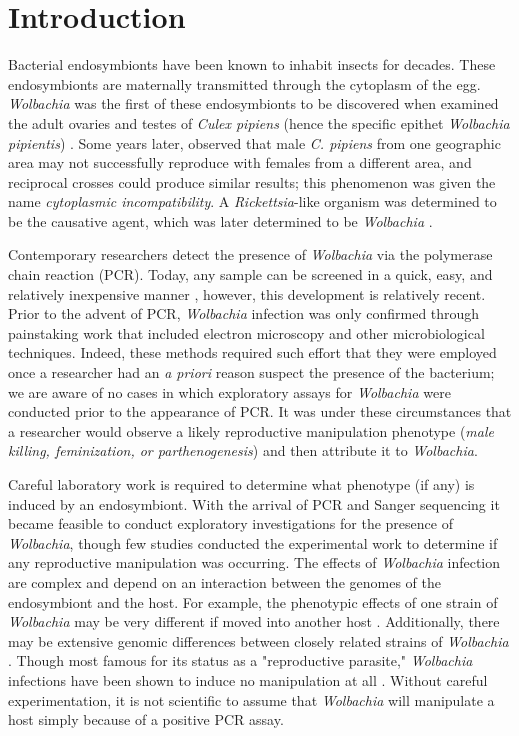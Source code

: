 \documentclass{frontiersSCNS}
\begin{document}
\section{Introduction}

Bacterial endosymbionts have been known to inhabit insects for decades. These endosymbionts are maternally transmitted through the cytoplasm of the egg. \textit{Wolbachia} was the first of these endosymbionts to be discovered when \citet{Hertig:1924wy} examined the adult ovaries and testes of \textit{Culex pipiens} (hence the specific epithet \textit{Wolbachia pipientis}) \citet{Hertig:1936}. Some years later, \citet{Yen:1971tc} observed that male \textit{C. pipiens} from one geographic area may not successfully reproduce with females from a different area, and reciprocal crosses could produce similar results; this phenomenon was given the name \textit{cytoplasmic incompatibility}. A \textit{Rickettsia}-like organism was determined to be the causative agent, which was later determined to be \textit{Wolbachia} \citep{Yen:1973vx}.

Contemporary researchers detect the presence of \textit{Wolbachia} via the polymerase chain reaction (PCR). Today, any sample can be screened in a quick, easy, and relatively inexpensive manner \citep{Baldo:2006p7025,Simoes:2011p11073}, however, this development is relatively recent. Prior to the advent of PCR, \textit{Wolbachia} infection was only confirmed through painstaking work that included electron microscopy and other microbiological techniques. Indeed, these methods required such effort that they were employed once a researcher had an \textit{a priori} reason suspect the presence of the bacterium; we are aware of no cases in which exploratory assays for \textit{Wolbachia} were conducted prior to the appearance of PCR. It was under these circumstances that a researcher would observe a likely reproductive manipulation phenotype (\emph{male killing, feminization, \emph{or} parthenogenesis}) and then attribute it to \textit{Wolbachia}.

Careful laboratory work is required to determine what phenotype (if any) is induced by an endosymbiont. With the arrival of PCR and Sanger sequencing it became feasible to conduct exploratory investigations for the presence of \textit{Wolbachia}, though few studies conducted the experimental work to determine if any reproductive manipulation was occurring. The effects of \textit{Wolbachia} infection are complex and depend on an interaction between the genomes of the endosymbiont and the host. For example, the phenotypic effects of one strain of \textit{Wolbachia} may be very different if moved into another host \citep{Rigaud:2001fv,Hoffmann:2011p11474}. Additionally, there may be extensive genomic differences between closely related strains of \textit{Wolbachia} \citep{Ishmael:2009p8257}. Though most famous for its status as a "reproductive parasite," \textit{Wolbachia} infections have been shown to induce no manipulation at all \citep{Hamm:2014cv,Zhang:2010jl,Zhang:2013eo}. Without careful experimentation, it is not scientific to assume that \textit{Wolbachia} will manipulate a host simply because of a positive PCR assay. 
\end{document}
